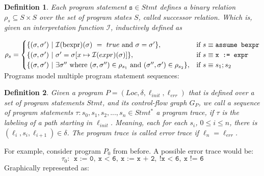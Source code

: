 \documentclass{article}
\newtheorem{mydef}{Definition}
\begin{document}
\begin{mydef}
	Each program statement $\texttt{s} \in Stmt$ defines a binary relation $\rho_s \subseteq S \times S$ over the set of program states $S$, called successor relation. Which is, given an interpretation function $\mathcal{I}$, inductively defined as \\
\end{mydef}
	 $ \rho_s =
\begin{cases}
	\{(\sigma, \sigma')\ |\ \mathcal{I}(\text{bexpr})(\sigma)\ =\ true\ \text{and}\ \sigma = \sigma'\} , & \text{if}\ s \equiv \text{\texttt{assume bexpr}} \\
	\{(\sigma, \sigma')\ |\ \sigma' = \sigma[x \mapsto \mathcal{I}(expr)(\sigma)]\} , & \text{if}\ s \equiv \texttt{x := expr} \\
	\{(\sigma, \sigma')\ |\ \exists \sigma''\ \text{where}\ (\sigma, \sigma'') \in \rho_{s_1}\ \text{and}\ (\sigma'', \sigma') \in \rho_{s_2} \}, & \text{if}\ s \equiv \texttt{$s_1;s_2$}
\end{cases}
$
\vspace{0.7cm} \\ 
Programs model multiple program statement sequences:
\begin{mydef}
Given a program $P = (Loc, \delta, \ell_{init}, \ell_{err})$ that is defined over a set of program statements $Stmt$, and its control-flow graph $G_P$, we call a sequence of program statements $\tau: s_0, s_1, s_2, ..., s_n \in Stmt^*$ a program trace, if $\tau$ is the labeling of a path starting in $\ell_{init}$. Meaning, each for each $s_i$, $0 \leq i \leq n$, there is $(\ell_i, s_i, \ell_{i+1}) \in \delta$. The program trace is called error trace if $\ell_n = \ell_{err}$.  
\end{mydef}

For example, consider program $P_0$ from before. A possible error trace would be:
\begin{equation*}
	\tau_0:\ \ \texttt{x := 0},\ \texttt{x < 6},\ \texttt{x := x + 2},\ \texttt{!x < 6},\ \texttt{x != 6}
\end{equation*}
Graphically represented as:
\end{document}
